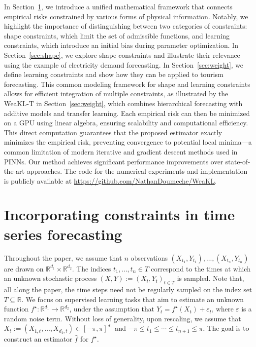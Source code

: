 In Section~\ref{sec:weak}, we introduce a unified mathematical framework that connects empirical risks constrained by various forms of physical information. Notably, we highlight the importance of distinguishing between two categories of constraints: shape constraints, which limit the set of admissible functions, and learning constraints, which introduce an initial bias during parameter optimization. In Section~\ref{sec:shape}, we explore shape constraints and illustrate their relevance using the example of electricity demand forecasting.
In Section~\ref{sec:weight}, we define learning constraints and show how they can be applied to tourism forecasting.
This common modeling framework for shape and learning constraints allows for efficient integration of multiple constraints, as illustrated by the WeaKL-T in Section~\ref{sec:weight}, which combines hierarchical forecasting with additive models and transfer learning. 
Each empirical risk can then be minimized on a GPU using linear algebra, ensuring scalability and computational efficiency. 
This direct computation guarantees that the proposed estimator exactly minimizes the empirical risk, preventing convergence to potential local minima---a common limitation of modern iterative and gradient descent methods used in PINNs.
Our method achieves significant performance improvements over state-of-the-art approaches. 
\if{}
{
The code for the numerical experiments and implementation is publicly available at \url{https://github.com/NathanDoumeche/WeaKL}.
}\fi






\section{Incorporating constraints in time series forecasting}
\label{sec:weak}
Throughout the paper, we assume that $n$ observations $(X_{t_1}, Y_{t_1}), \ldots, (X_{t_n}, Y_{t_n})$ are drawn on $\mathbb{R}^{d_1} \times \mathbb{R}^{d_2}$. 
The indices $t_1, \ldots, t_n \in T$ correspond to the times at which an unknown stochastic process $(X,Y):=(X_t, Y_t)_{t \in T}$ is sampled.
Note that, all along the paper, the time steps need not be regularly sampled on the index set $T \subseteq \mathbb R$. 
We focus on supervised learning tasks that aim to estimate an unknown function $f^\star : \mathbb{R}^{d_1} \to \mathbb{R}^{d_2}$, under the assumption that $Y_t = f^\star(X_t) + \varepsilon_t$, where $\varepsilon$ is a random noise term. Without loss of generality, upon rescaling, we assume that $X_t:= (X_{1,t}, \hdots, X_{d_1,t}) \in [-\pi, \pi]^{d_1}$ and $-\pi \leq t_1 \leq  \cdots \leq  t_{n+1}\leq \pi$. The goal is to construct an estimator $\hat{f}$ for $f^\star$. 

